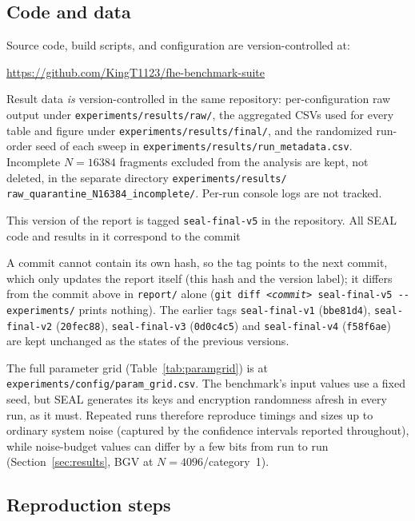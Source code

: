 \subsection{Code and data}

Source code, build scripts, and configuration are version-controlled at:
\begin{center}
\url{https://github.com/KingT1123/fhe-benchmark-suite}
\end{center}
{\sloppy Result data \emph{is} version-controlled in the same repository: per-configuration raw output under \nolinkurl{experiments/results/raw/}, the aggregated CSVs used for every table and figure under \nolinkurl{experiments/results/final/}, and the randomized run-order seed of each sweep in \nolinkurl{experiments/results/run_metadata.csv}. Incomplete $N{=}16384$ fragments excluded from the analysis are kept, not deleted, in the separate directory \nolinkurl{experiments/results/} \nolinkurl{raw_quarantine_N16384_incomplete/}. Per-run console logs are not tracked.\par}

{\sloppy This version of the report is tagged \texttt{seal-final-v5} in the repository. All SEAL code and results in it correspond to the commit
\begin{center}
\sealcommit
\end{center}
A commit cannot contain its own hash, so the tag points to the next commit, which only updates the report itself (this hash and the version label); it differs from the commit above in \texttt{report/} alone (\texttt{git diff \textit{<commit>} seal-final-v5 -{}- experiments/} prints nothing). The earlier tags \texttt{seal-final-v1} (\texttt{bbe81d4}), \texttt{seal-final-v2} (\texttt{20fec88}), \texttt{seal-final-v3} (\texttt{0d0c4c5}) and \texttt{seal-final-v4} (\texttt{f58f6ae}) are kept unchanged as the states of the previous versions.\par}

The full parameter grid (Table~\ref{tab:paramgrid}) is at \texttt{experiments/config/param\_grid.csv}. The benchmark's input values use a fixed seed, but SEAL generates its keys and encryption randomness afresh in every run, as it must. Repeated runs therefore reproduce timings and sizes up to ordinary system noise (captured by the confidence intervals reported throughout), while noise-budget values can differ by a few bits from run to run (Section~\ref{sec:results}, BGV at $N{=}4096$/category~1).

\subsection{Reproduction steps}

